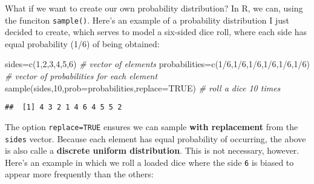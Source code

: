 \documentclass[
]{book}
\newenvironment{Shaded}{\begin{snugshade}}{\end{snugshade}}
\newcommand{\AttributeTok}[1]{\textcolor[rgb]{0.77,0.63,0.00}{#1}}
\newcommand{\CommentTok}[1]{\textcolor[rgb]{0.56,0.35,0.01}{\textit{#1}}}
\newcommand{\ConstantTok}[1]{\textcolor[rgb]{0.00,0.00,0.00}{#1}}
\newcommand{\DecValTok}[1]{\textcolor[rgb]{0.00,0.00,0.81}{#1}}
\newcommand{\FunctionTok}[1]{\textcolor[rgb]{0.00,0.00,0.00}{#1}}
\newcommand{\NormalTok}[1]{#1}
\newcommand{\OtherTok}[1]{\textcolor[rgb]{0.56,0.35,0.01}{#1}}
\newcommand{\SpecialCharTok}[1]{\textcolor[rgb]{0.00,0.00,0.00}{#1}}
\begin{document}
What if we want to create our own probability distribution? In R, we can, using the funciton \texttt{sample()}. Here's an example of a probability distribution I just decided to create, which serves to model a six-sided dice roll, where each side has equal probability (1/6) of being obtained:

\begin{Shaded}
\begin{Highlighting}[]
\NormalTok{sides}\OtherTok{=}\FunctionTok{c}\NormalTok{(}\DecValTok{1}\NormalTok{,}\DecValTok{2}\NormalTok{,}\DecValTok{3}\NormalTok{,}\DecValTok{4}\NormalTok{,}\DecValTok{5}\NormalTok{,}\DecValTok{6}\NormalTok{) }\CommentTok{\# vector of elements}
\NormalTok{probabilities}\OtherTok{=}\FunctionTok{c}\NormalTok{(}\DecValTok{1}\SpecialCharTok{/}\DecValTok{6}\NormalTok{,}\DecValTok{1}\SpecialCharTok{/}\DecValTok{6}\NormalTok{,}\DecValTok{1}\SpecialCharTok{/}\DecValTok{6}\NormalTok{,}\DecValTok{1}\SpecialCharTok{/}\DecValTok{6}\NormalTok{,}\DecValTok{1}\SpecialCharTok{/}\DecValTok{6}\NormalTok{,}\DecValTok{1}\SpecialCharTok{/}\DecValTok{6}\NormalTok{) }\CommentTok{\# vector of probabilities for each element}
\FunctionTok{sample}\NormalTok{(sides,}\DecValTok{10}\NormalTok{,}\AttributeTok{prob=}\NormalTok{probabilities,}\AttributeTok{replace=}\ConstantTok{TRUE}\NormalTok{) }\CommentTok{\# roll a dice 10 times}
\end{Highlighting}
\end{Shaded}

\begin{verbatim}
##  [1] 4 3 2 1 4 6 4 5 5 2
\end{verbatim}

The option \texttt{replace=TRUE} ensures we can sample \textbf{with replacement} from the \texttt{sides} vector. Because each element has equal probability of occurring, the above is also calle a \textbf{discrete uniform distribution}. This is not necessary, however. Here's an example in which we roll a loaded dice where the side \texttt{6} is biased to appear more frequently than the others:
\end{document}
